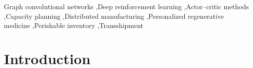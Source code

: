 \documentclass[preprint,review,12pt,nonatbib]{elsarticle}
\providecommand{\DIFadd}[1]{{\protect\color{blue}#1}} %
\providecommand{\DIFdel}[1]{} %
\providecommand{\DIFaddbegin}{} %
\providecommand{\DIFaddend}{} %
\providecommand{\DIFdelbegin}{} %
\providecommand{\DIFdelend}{} %
\providecommand{\DIFscaledelfig}{0.5}
\newlength{\DIFdelgraphicswidth} %
\newlength{\DIFdelgraphicsheight} %
\providecommand{\DIFaddincludegraphics}[2][]{{\color{blue}\fbox{\DIFOincludegraphics[#1]{#2}}}} %
\providecommand{\DIFdelincludegraphics}[2][]{%
\sbox{\DIFdelgraphicsbox}{\DIFOincludegraphics[#1]{#2}}%
\settoboxwidth{\DIFdelgraphicswidth}{\DIFdelgraphicsbox} %
\settoboxtotalheight{\DIFdelgraphicsheight}{\DIFdelgraphicsbox} %
\scalebox{\DIFscaledelfig}{%
\parbox[b]{\DIFdelgraphicswidth}{\usebox{\DIFdelgraphicsbox}\\[-\baselineskip] \rule{\DIFdelgraphicswidth}{0em}}\llap{\resizebox{\DIFdelgraphicswidth}{\DIFdelgraphicsheight}{%
\setlength{\unitlength}{\DIFdelgraphicswidth}%
\begin{picture}(1,1)%
\thicklines\linethickness{2pt} %
{\color[rgb]{1,0,0}\put(0,0){\framebox(1,1){}}}%
{\color[rgb]{1,0,0}\put(0,0){\line( 1,1){1}}}%
{\color[rgb]{1,0,0}\put(0,1){\line(1,-1){1}}}%
\end{picture}%
}\hspace*{3pt}}} %
} %
\DeclareRobustCommand{\DIFaddbegin}{\DIFOaddbegin \let\includegraphics\DIFaddincludegraphics} %
\DeclareRobustCommand{\DIFaddend}{\DIFOaddend \let\includegraphics\DIFOincludegraphics} %
\DeclareRobustCommand{\DIFdelbegin}{\DIFOdelbegin \let\includegraphics\DIFdelincludegraphics} %
\DeclareRobustCommand{\DIFdelend}{\DIFOaddend \let\includegraphics\DIFOincludegraphics} %
\begin{document}
\begin{frontmatter}
\begin{abstract}
healthcare manufacturing and \DIFdelbegin \DIFdel{provides a generalizable modeling framework }\DIFdelend \DIFaddbegin \DIFadd{a reusable benchmark }\DIFaddend for engineering systems with \DIFdelbegin \DIFdel{sequential decisions and }\DIFdelend graph-structured dependencies.
\end{abstract}

\begin{keyword}
Graph convolutional networks \sep Deep reinforcement learning \sep \DIFaddbegin \DIFadd{Actor--critic methods }\sep \DIFaddend Capacity planning \sep Distributed manufacturing \sep Personalized regenerative medicine \sep \DIFaddbegin \DIFadd{Perishable inventory }\sep \DIFaddend Transshipment
\end{keyword}

\end{frontmatter}
\linenumbers


\section{Introduction}
\label{sec:introduction}
\end{document}
